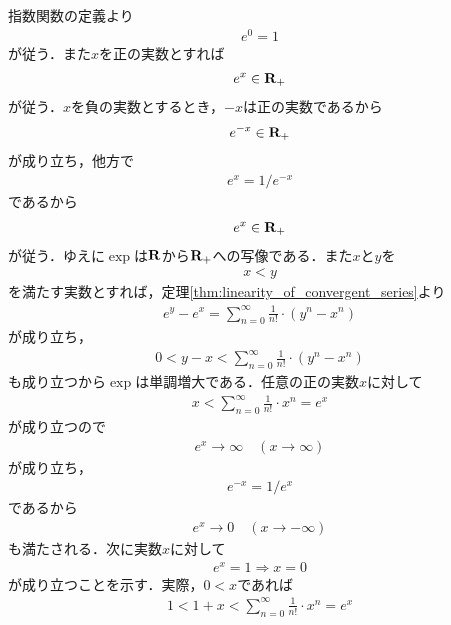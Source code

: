 	\begin{sketch}
		指数関数の定義より
		\begin{align}
			e^0 = 1
		\end{align}
		が従う．また$x$を正の実数とすれば
		\begin{align}
			e^{x} \in \mathbf{R}_+
		\end{align}
		が従う．$x$を負の実数とするとき，$-x$は正の実数であるから
		\begin{align}
			e^{-x} \in \mathbf{R}_+
		\end{align}
		が成り立ち，他方で
		\begin{align}
			e^{x} = 1/e^{-x}
		\end{align}
		であるから
		\begin{align}
			e^{x} \in \mathbf{R}_+
		\end{align}
		が従う．ゆえに$\exp$は$\mathbf{R}$から$\mathbf{R}_+$への写像である．また$x$と$y$を
		\begin{align}
			x < y
		\end{align}
		を満たす実数とすれば，定理\ref{thm:linearity_of_convergent_series}より
		\begin{align}
			e^{y} - e^{x} = \sum_{n=0}^{\infty} \frac{1}{n!} \cdot (y^n - x^n) 
		\end{align}
		が成り立ち，
		\begin{align}
			0 < y - x < \sum_{n=0}^{\infty} \frac{1}{n!} \cdot (y^n - x^n) 
		\end{align}
		も成り立つから$\exp$は単調増大である．任意の正の実数$x$に対して
		\begin{align}
			x < \sum_{n=0}^{\infty} \frac{1}{n!} \cdot x^n = e^{x}
		\end{align}
		が成り立つので
		\begin{align}
			e^x \longrightarrow \infty \quad (x \longrightarrow \infty)
		\end{align}
		が成り立ち，
		\begin{align}
			e^{-x} = 1/e^{x}
		\end{align}
		であるから
		\begin{align}
			e^x \longrightarrow 0 \quad (x \longrightarrow -\infty)
		\end{align}
		も満たされる．次に実数$x$に対して
		\begin{align}
			e^x = 1 \Longrightarrow x=0
			\label{fom:thm_real_valued_exponential_function}
		\end{align}
		が成り立つことを示す．実際，$0 < x$であれば
		\begin{align}
			1 < 1 + x < \sum_{n=0}^{\infty} \frac{1}{n!} \cdot x^n = e^{x}

\end{align}
\end{sketch}

